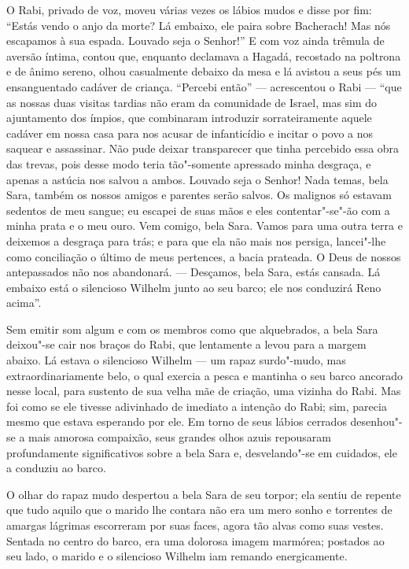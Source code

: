 O Rabi, privado de voz, moveu várias vezes os lábios mudos e disse por
fim: ``Estás vendo o anjo da morte? Lá embaixo, ele paira sobre
Bacherach! Mas nós escapamos à sua espada. Louvado seja o Senhor!'' E
com voz ainda trêmula de aversão íntima, contou que, enquanto declamava
a Hagadá, recostado na poltrona e de ânimo sereno, olhou casualmente
debaixo da mesa e lá avistou a seus pés um ensanguentado cadáver de
criança. ``Percebi então'' --- acrescentou o Rabi --- ``que as nossas duas
visitas tardias não eram da comunidade de Israel, mas sim do
ajuntamento dos ímpios, que combinaram introduzir sorrateiramente
aquele cadáver em nossa casa para nos acusar de infanticídio e incitar
o povo a nos saquear e assassinar. Não pude deixar transparecer que
tinha percebido essa obra das trevas, pois desse modo teria
tão"-somente apressado minha desgraça, e apenas a astúcia nos salvou a
ambos. Louvado seja o Senhor! Nada temas, bela Sara, também os nossos
amigos e parentes serão salvos. Os malignos só estavam sedentos de meu
sangue; eu escapei de suas mãos e eles contentar"-se"-ão com a minha
prata e o meu ouro. Vem comigo, bela Sara. Vamos para uma outra terra e
deixemos a desgraça para trás; e para que ela não mais nos persiga,
lancei"-lhe como conciliação o último de meus pertences, a bacia
prateada. O Deus de nossos antepassados não nos abandonará. --- Desçamos,
bela Sara, estás cansada. Lá embaixo está o silencioso Wilhelm junto ao
seu barco; ele nos conduzirá Reno acima''.

Sem emitir som algum e com os membros como que alquebrados, a bela Sara
deixou"-se cair nos braços do Rabi, que lentamente a levou para a
margem abaixo. Lá estava o silencioso Wilhelm --- um rapaz surdo"-mudo,
mas extraordinariamente belo, o qual exercia a pesca e mantinha o seu
barco ancorado nesse local, para sustento de sua velha mãe de criação,
uma vizinha do Rabi. Mas foi como se ele tivesse adivinhado de imediato
a intenção do Rabi; sim, parecia mesmo que estava esperando por ele. Em
torno de seus lábios cerrados desenhou"-se a mais amorosa compaixão,
seus grandes olhos azuis repousaram profundamente significativos sobre
a bela Sara e, desvelando"-se em cuidados, ele a conduziu ao barco.

O olhar do rapaz mudo despertou a bela Sara de seu torpor; ela sentiu de
repente que tudo aquilo que o marido lhe contara não era um mero sonho
e torrentes de amargas lágrimas escorreram por suas faces, agora tão
alvas como suas vestes. Sentada no centro do barco, era uma dolorosa
imagem marmórea; postados ao seu lado, o marido e o silencioso Wilhelm
iam remando energicamente.

